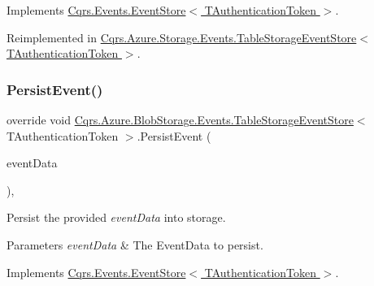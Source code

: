 Implements \hyperlink{classCqrs_1_1Events_1_1EventStore_a0096646f5dff730b0041b9469719c420_a0096646f5dff730b0041b9469719c420}{Cqrs.\+Events.\+Event\+Store$<$ T\+Authentication\+Token $>$}.



Reimplemented in \hyperlink{classCqrs_1_1Azure_1_1Storage_1_1Events_1_1TableStorageEventStore_a1b436bbb111b14b85ee6ba7f90fb1a35_a1b436bbb111b14b85ee6ba7f90fb1a35}{Cqrs.\+Azure.\+Storage.\+Events.\+Table\+Storage\+Event\+Store$<$ T\+Authentication\+Token $>$}.

\mbox{\label{classCqrs_1_1Azure_1_1BlobStorage_1_1Events_1_1TableStorageEventStore_ae63921d0ace265b1b269c865080b5712_ae63921d0ace265b1b269c865080b5712}} 
\subsubsection{\texorpdfstring{Persist\+Event()}{PersistEvent()}}
{\footnotesize\ttfamily override void \hyperlink{classCqrs_1_1Azure_1_1BlobStorage_1_1Events_1_1TableStorageEventStore}{Cqrs.\+Azure.\+Blob\+Storage.\+Events.\+Table\+Storage\+Event\+Store}$<$ T\+Authentication\+Token $>$.Persist\+Event (\begin{DoxyParamCaption}\item[{\hyperlink{classCqrs_1_1Events_1_1EventData}{Event\+Data}}]{event\+Data }\end{DoxyParamCaption})\hspace{0.3cm}{\ttfamily [protected]}, {\ttfamily [virtual]}}



Persist the provided {\itshape event\+Data}  into storage. 


\begin{DoxyParams}{Parameters}
{\em event\+Data} & The Event\+Data to persist.\\
\hline
\end{DoxyParams}


Implements \hyperlink{classCqrs_1_1Events_1_1EventStore_aedb71ca0ddf21220e323bc60ad7508cd_aedb71ca0ddf21220e323bc60ad7508cd}{Cqrs.\+Events.\+Event\+Store$<$ T\+Authentication\+Token $>$}.



